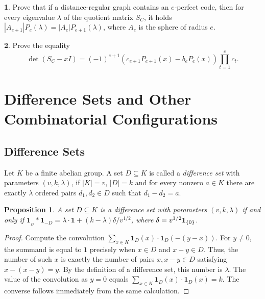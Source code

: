 \documentclass[11pt]{article}
\newtheorem{claim}{Proposition}[section]
\theoremstyle{definition}
\newtheorem{exercise}{\quad}
\begin{document}
{{{\begin{exercise}

Prove that if a distance-regular graph contains an $e$-perfect code, then for every eigenvalue $\lambda$ of the
quotient matrix $S_C$, it holds
$
|A_{e+1}|P_e(\lambda)=|A_e|P_{e+1}(\lambda)$,
where $A_e$ is the sphere of radius $e$.

\end{exercise}

\begin{exercise}

Prove the equality
\[
\det(S_C-xI)
=(-1)^{e+1}
(c_{e+1}P_{e+1}(x)-b_eP_e(x))
\prod\limits_{t=1}^e c_t.
\]

\end{exercise}


\section{Difference Sets and Other Combinatorial Configurations}

\subsection{Difference Sets}

Let $K$ be a finite abelian group.
    A set $D\subseteq K$ is called a {\sl difference set}
     with parameters $(v,k,\lambda)$,
    if $|K|=v$, $|D|=k$ and for every nonzero $a\in K$
    there are exactly $\lambda$  ordered pairs $d_1, d_2\in D$ such that $d_1-d_2=a$.

\begin{claim}\label{c:diffset}
A set $D\subseteq K$ is a difference set
 with parameters $(v,k,\lambda)$ if and only if
  ${\mathbf 1}_{_D} *{\mathbf 1}_{-D}=\lambda\cdot\mathbf{1}
+(k-\lambda)\delta/v^{1/2}$, where $\delta=v^{1/2}{\bf 1}_{\{0\}}$.
\end{claim}
\begin{proof}
Compute the convolution $\sum\limits_{x\in
K}{\mathbf 1}_{D}(x)\cdot{\mathbf 1}_{D}(-(y-x))$. For $y\ne 0$, the summand is equal to $1$ precisely when
$x\in D$  and $x-y\in D$. Thus, the number of such $x$ is exactly the number of pairs
$x,x-y\in D$ satisfying
$x-(x-y)=y$.
 By the
definition of a difference set, this number is $\lambda$.
The value of the convolution as $y=0$
equals $\sum\limits_{x\in K}{\mathbf 1}_{D}(x)\cdot{\mathbf 1}_{D}(x)=k$.
The converse follows immediately from the same calculation.
\end{proof}

}}}
\end{document}
